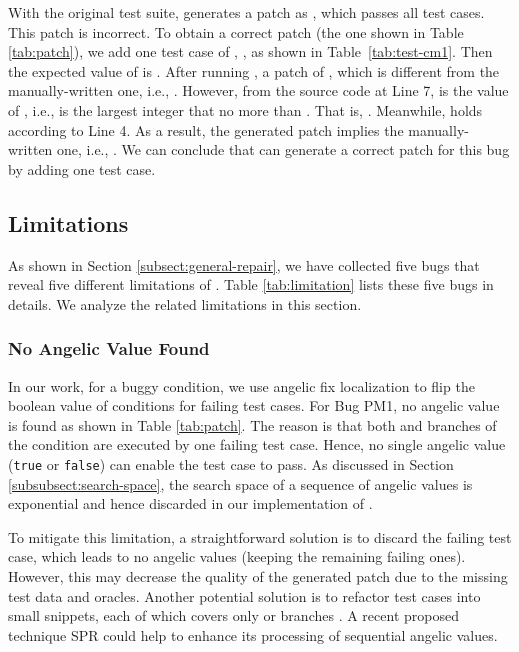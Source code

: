 With the original test suite, \nopol generates a patch as , which passes all test cases. This patch is incorrect. 
To obtain a correct patch (the one shown in Table \ref{tab:patch}), we add one test case of , , as shown in Table~\ref{tab:test-cm1}. Then the expected value of  is . After running \nopol, a patch of , which is different from the manually-written one, i.e., . However, from the source code at Line 7,  is the  value of , i.e.,  is the largest integer that no more than . That is, . Meanwhile,  holds according to Line 4. As a result, the generated patch  implies the manually-written one, i.e., . We can conclude that \nopol can generate a correct patch for this bug by adding one test case. 

\subsection{Limitations}
\label{subsect:limitation}  

As shown in Section \ref{subsect:general-repair}, we have collected five bugs that reveal five different limitations of \nopol. Table \ref{tab:limitation} lists these five bugs in details. We analyze the related limitations in this section.  

\subsubsection{No Angelic Value Found}
\label{subsubsect:limit-pm1}

In our work, for a buggy \ourif condition, we use angelic fix localization to flip the boolean value of conditions for failing test cases. 
For Bug PM1, no angelic value is found as shown in Table \ref{tab:patch}. 
The reason is that both  and  branches of the \ourif condition are executed by one failing test case. Hence, no single angelic value (\texttt{true} or \texttt{false}) can enable the test case to pass. As discussed in Section \ref{subsubsect:search-space}, the search space of a sequence of angelic values is exponential and hence discarded in our implementation of \nopol.

To mitigate this limitation, a straightforward solution is to discard the failing test case, which leads to no angelic values (keeping the remaining failing ones). However, this may decrease the quality of the generated patch due to the missing test data and oracles. Another potential solution is to refactor test cases into small snippets, each of which covers only  or  branches \cite{brefactoring}. A recent proposed technique SPR \cite{DBLP:conf/sigsoft/LongR15} could help \nopol to enhance its processing of sequential angelic values.

